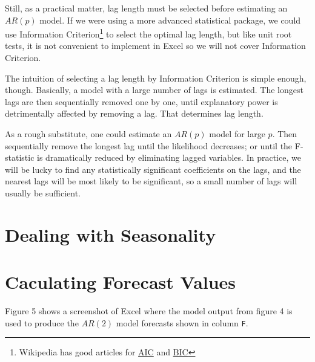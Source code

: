 \documentclass[
  letterpaper,
  DIV=11,
  numbers=noendperiod]{scrreprt}
\begin{document}
Still, as a practical matter, lag length must be selected before
estimating an \(AR(p)\) model. If we were using a more advanced
statistical package, we could use Information Criterion\footnote{Wikipedia
  has good articles for
  \href{https://en.wikipedia.org/wiki/Akaike_information_criterion}{AIC}
  and
  \href{https://en.wikipedia.org/wiki/Bayesian_information_criterion}{BIC}}
to select the optimal lag length, but like unit root tests, it is not
convenient to implement in Excel so we will not cover Information
Criterion.

The intuition of selecting a lag length by Information Criterion is
simple enough, though. Basically, a model with a large number of lags is
estimated. The longest lags are then sequentially removed one by one,
until explanatory power is detrimentally affected by removing a lag.
That determines lag length.

As a rough substitute, one could estimate an \(AR(p)\) model for large
\(p\). Then sequentially remove the longest lag until the likelihood
decreases; or until the F-statistic is dramatically reduced by
eliminating lagged variables. In practice, we will be lucky to find any
statistically significant coefficients on the lags, and the nearest lags
will be most likely to be significant, so a small number of lags will
usually be sufficient.

\hypertarget{dealing-with-seasonality}{%
\section{Dealing with Seasonality}\label{dealing-with-seasonality}}

\hypertarget{caculating-forecast-values}{%
\section{Caculating Forecast Values}\label{caculating-forecast-values}}

Figure 5 shows a screenshot of Excel where the model output from figure
4 is used to produce the \(AR(2)\) model forecasts shown in column
\texttt{F}.
\end{document}
